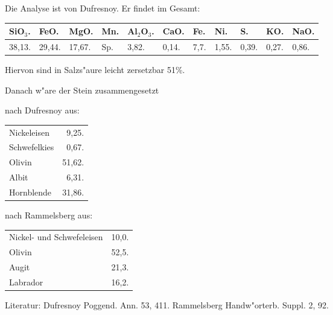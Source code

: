 \documentclass[a4paper, 11pt, oneside]{article}
\begin{document}
Die Analyse ist von Dufresnoy. Er findet im Gesamt:
\begin{table}[!ht]
    \centering\swabfamily\Large
    \normalsize
    \begin{tabular}{l l l l l l l l l l l}
        SiO$_{3}$. & FeO. & MgO. & Mn. & Al$_{2}$O$_{3}$. & CaO. & Fe. & Ni. & S. & KO. & NaO. \\ \hline
        38,13. & 29,44. & 17,67. & Sp. & 3,82. & 0,14. & 7,7. & 1,55. & 0,39. & 0,27. & 0,86. \\
    \end{tabular}
\end{table}

Hiervon sind in Salzs"aure leicht zersetzbar 51\%.

Danach w"are der Stein zusammengesetzt
\begin{center}
nach Dufresnoy aus:
\end{center}
\begin{table}[!ht]
    \centering\swabfamily\Large
    \begin{tabular}{l r}
        Nickeleisen & 9,25. \\
        Schwefelkies & 0,67. \\
        Olivin & 51,62. \\
        Albit & 6,31. \\
        Hornblende & 31,86. \\
    \end{tabular}
\end{table}
\begin{center}
nach Rammelsberg aus:
\end{center}
\begin{table}[!ht]
    \centering\swabfamily\Large
    \begin{tabular}{l r}
        Nickel- und Schwefeleisen  & 10,0. \\
        Olivin & 52,5. \\
        Augit & 21,3. \\
        Labrador & 16,2. \\
    \end{tabular}
\end{table}

\normalsize
Literatur: Dufresnoy Poggend. Ann. 53, 411. Rammelsberg Handw"orterb. Suppl. 2, 92.

\subsection{}
\LARGE
\end{document}
